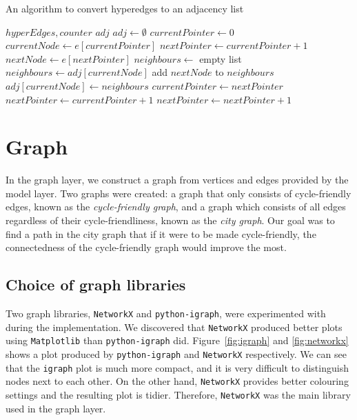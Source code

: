 \documentclass[12pt,a4paper]{report}
\begin{document}
\begin{algorithm}
\caption{An algorithm to convert hyperedges to an adjacency list}\label{alg:adj}
\begin{algorithmic}
\Require $hyperEdges, counter$
\Ensure $adj$
\State $adj\gets \emptyset$
    \State $currentPointer\gets 0$
    \State $currentNode\gets e[currentPointer]$
    \State $nextPointer \gets currentPointer + 1$
        \State $nextNode\gets e[nextPointer]$
                \State $neighbours\gets$ empty list
                    \State $neighbours\gets adj[currentNode]$
                \EndIf
                \State add $nextNode$ to $neighbours$
                \State $adj[currentNode]\gets neighbours$
                \State $currentPointer\gets nextPointer$
                \State $nextPointer\gets currentPointer + 1$
            \EndIf
        \Else
            \State $nextPointer\gets nextPointer + 1$
        \EndIf
    \EndWhile
\EndFor
\end{algorithmic}
\end{algorithm}


\section{Graph}
In the graph layer, we construct a graph from vertices and edges provided by the model layer. Two graphs were created: a graph that only consists of cycle-friendly edges, known as the \textit{cycle-friendly graph}, and a graph which consists of all edges regardless of their cycle-friendliness, known as the \textit{city graph}. Our goal was to find a path in the city graph that if it were to be made cycle-friendly, the connectedness of the cycle-friendly graph would improve the most.

\subsection{Choice of graph libraries}
Two graph libraries, \texttt{NetworkX} and \texttt{python-igraph}, were experimented with during the implementation. We discovered that \texttt{NetworkX} produced better plots using \texttt{Matplotlib} than \texttt{python-igraph} did. Figure~\ref{fig:igraph} and \ref{fig:networkx} shows a plot produced by \texttt{python-igraph} and \texttt{NetworkX} respectively. We can see that the \texttt{igraph} plot is much more compact, and it is very difficult to distinguish nodes next to each other. On the other hand, \texttt{NetworkX} provides better colouring settings and the resulting plot is tidier. Therefore, \texttt{NetworkX} was the main library used in the graph layer.
\end{document}
